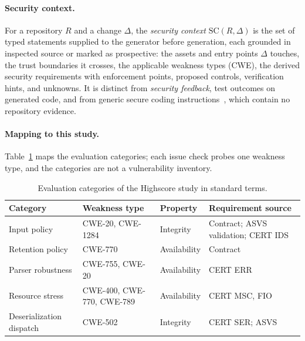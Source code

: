 \paragraph{Security context.}
For a repository $R$ and a change $\Delta$, the \emph{security context}
$\mathrm{SC}(R,\Delta)$ is the set of typed statements supplied to the
generator before generation, each grounded in inspected source or marked as
prospective: the assets and entry points $\Delta$ touches, the trust
boundaries it crosses, the applicable weakness types (CWE), the derived
security requirements with enforcement points, proposed controls,
verification hints, and unknowns. It is distinct from \emph{security
feedback}, test outcomes on generated code, and from generic secure coding
instructions~\citep{tony2025}, which contain no repository evidence.

\paragraph{Mapping to this study.}
Table~\ref{tab:mapping} maps the evaluation categories; each issue check
probes one weakness type, and the categories are not a vulnerability
inventory.

\begin{table}[t]
\centering
\footnotesize
\setlength{\tabcolsep}{4pt}
\caption{Evaluation categories of the Highscore study in standard terms.}
\label{tab:mapping}
\begin{tabular}{@{}llll@{}}
\toprule
Category & Weakness type & Property & Requirement source \\
\midrule
Input policy & CWE-20, CWE-1284 & Integrity & Contract; ASVS validation; CERT IDS \\
Retention policy & CWE-770 & Availability & Contract \\
Parser robustness & CWE-755, CWE-20 & Availability & CERT ERR \\
Resource stress & CWE-400, CWE-770, CWE-789 & Availability & CERT MSC, FIO \\
Deserialization dispatch & CWE-502 & Integrity & CERT SER; ASVS \\
\bottomrule
\end{tabular}
\end{table}
